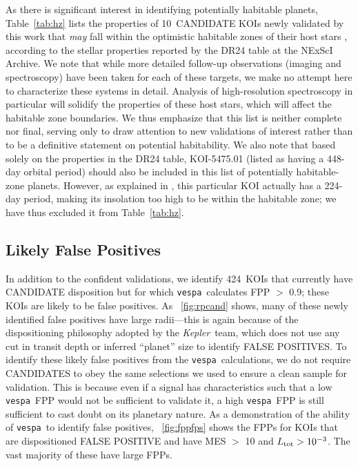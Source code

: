 \documentclass{emulateapj}
\newcommand{\figref}[1]{\ref{fig:#1}}
\newcommand{\Fig}[1]{\figurename~\figref{#1}}
\newcommand{\Tab}[1]{Table~\ref{tab:#1}}
\newcommand{\tab}[1]{\Tab{#1}}
\newcommand{\nfpnew}{424}  %
\newcommand{\nhz}{10}
\newcommand{\kepler}{\textit{Kepler}}
\newcommand{\vespa}{\texttt{vespa}}
\begin{document}



As there is significant interest in identifying potentially habitable
planets, \tab{hz} lists the properties of \nhz\ CANDIDATE KOIs newly
validated by this work that \textit{may} fall within the optimistic
habitable zones of their host stars \citep{Kopparapu:2013}, 
according to the stellar
properties reported by the DR24 table at the NExScI Archive.  We note
that while more detailed follow-up observations (imaging and
spectroscopy) have been taken for each of these targets, we make no
attempt here to characterize these systems in detail.  Analysis of
high-resolution spectroscopy in particular will solidify the
properties of these host stars, which will affect the habitable zone
boundaries.  We thus emphasize that this list is neither complete nor
final, serving only to draw attention to new validations of 
interest rather than to be a definitive statement on potential 
habitability.  We also note that based solely on the properties in the 
DR24 table, KOI-5475.01 (listed as having a 448-day orbital period) 
should also be included in this list of potentially habitable-zone
planets.  However, as explained in \citet[][Section 5.5.4]{Coughlin:2015},
this particular KOI actually has a 224-day period, making its insolation
too high to be within the habitable zone; we have thus excluded it 
from \tab{hz}.


\subsection{Likely False Positives}

In addition to the confident validations, we identify \nfpnew\ KOIs
that currently have CANDIDATE disposition but for which \vespa\
calculates FPP $>$ 0.9; these KOIs are likely to be false positives.
As \Fig{rpcand} shows, many of these newly identified false positives
have large radii---this is again because of the dispositioning
philosophy adopted by the \kepler\ team, which does not use any cut in
transit depth or inferred ``planet'' size to identify FALSE POSITIVES.
To identify these likely false positives from the \vespa\
calculations, we do not require CANDIDATES to obey the same selections
we used to ensure a clean sample for validation.  This is because even
if a signal has characteristics such that a low \vespa\ FPP would not
be sufficient to validate it, a high \vespa\ FPP is still sufficient
to cast doubt on its planetary nature. As a demonstration of the
ability of \vespa\ to identify false positives, \Fig{fppfps} shows the
FPPs for KOIs that are dispositioned FALSE POSITIVE and have MES $>$
10 and $L_{\rm tot} > 10^{-3}$. The vast majority of these have large
FPPs.
\end{document}
